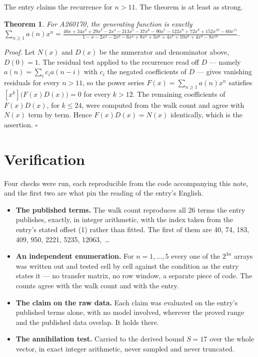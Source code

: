 \documentclass[11pt]{article}
\newtheorem{theorem}{Theorem}
\theoremstyle{definition}
\begin{document}
The entry claims the recurrence for $n > 11$. The theorem is at least as strong.

\begin{theorem} For A260170, the generating function is exactly $\sum_{n\ge 1} a(n)x^n = \frac{40x + 34x^{2} + 29x^{3} - 2x^{4} - 213x^{5} - 37x^{6} - 90x^{7} - 122x^{8} + 72x^{9} + 152x^{10} - 60x^{11}}{1 - x - 2x^{2} - 2x^{3} - 6x^{4} + 8x^{5} + 3x^{6} + 4x^{7} + 10x^{8} + 4x^{9} - 8x^{10}}$.\end{theorem}

{\itshape Proof.} Let $N(x)$ and $D(x)$ be the numerator and denominator above, $D(0)=1$. The residual test applied to the recurrence read off $D$ --- namely $a(n) = \sum_i c_i a(n-i)$ with $c_i$ the negated coefficients of $D$ --- gives vanishing residuals for every $n > 11$, so the power series $F(x)=\sum_{n\ge 1}a(n)x^n$ satisfies $[x^k]\bigl(F(x)D(x)\bigr) = 0$ for every $k > 12$. The remaining coefficients of $F(x)D(x)$, for $k \le 24$, were computed from the walk count and agree with $N(x)$ term by term. Hence $F(x)D(x) = N(x)$ identically, which is the assertion. $\square$

\section{Verification}

Four checks were run, each reproducible from the code accompanying this note, and the first two are what pin the reading of the entry's English.

\begin{itemize}

\item {\bfseries The published terms.} The walk count reproduces all 26 terms the entry publishes, exactly, in integer arithmetic, with the index taken from the entry's stated offset (1) rather than fitted. The first of them are 40, 74, 183, 409, 950, 2221, 5235, 12063,~\dots

\item {\bfseries An independent enumeration.} For $n = 1,\dots,5$ every one of the $2^{3n}$ arrays was written out and tested cell by cell against the condition as the entry states it --- no transfer matrix, no row window, a separate piece of code. The counts agree with the walk count and with the entry.

\item {\bfseries The claim on the raw data.} Each claim was evaluated on the entry's published terms alone, with no model involved, wherever the proved range and the published data overlap. It holds there.

\item {\bfseries The annihilation test.} Carried to the derived bound $S = 17$ over the whole vector, in exact integer arithmetic, never sampled and never truncated.

\end{itemize}
\end{document}
